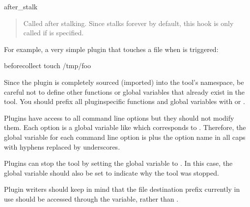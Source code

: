 \documentclass[letterpaper,10pt,english]{sphinxmanual}
\begin{document}
\begin{fulllineitems}
\sphinxAtStartPar
after\_stalk
\begin{quote}

\sphinxAtStartPar
Called after stalking.  Since  stalks forever by default,
this hook is only called if {\hyperref[\detokenize{mariadb-stat:cmdoption-mariadb-stat-iterations}]{}} is specified.
\end{quote}

\sphinxAtStartPar
For example, a very simple plugin that touches a file when {\hyperref[\detokenize{mariadb-stat:cmdoption-mariadb-stat-collect}]{}}
is triggered:

\begin{sphinxVerbatim}[commandchars=\\\{\}]
before\PYGZus{}collect 
   touch /tmp/foo
\end{sphinxVerbatim}

\sphinxAtStartPar
Since the plugin is completely sourced (imported) into the tool’s namespace,
be careful not to define other functions or global variables that already
exist in the tool.  You should prefix all plugin\sphinxhyphen{}specific functions and
global variables with  or .

\sphinxAtStartPar
Plugins have access to all command line options but they should not modify
them.  Each option is a global variable like  which corresponds
to {\hyperref[\detokenize{mariadb-stat:cmdoption-mariadb-stat-dest}]{}}.  Therefore, the global variable for each command line option
is  plus the option name in all caps with hyphens replaced by
underscores.

\sphinxAtStartPar
Plugins can stop the tool by setting the global variable 
to .  In this case, the global variable  should also
be set to indicate why the tool was stopped.

\sphinxAtStartPar
Plugin writers should keep in mind that the file destination prefix currently
in use should be accessed through the  variable, rather than
.

\end{fulllineitems}
\end{document}
